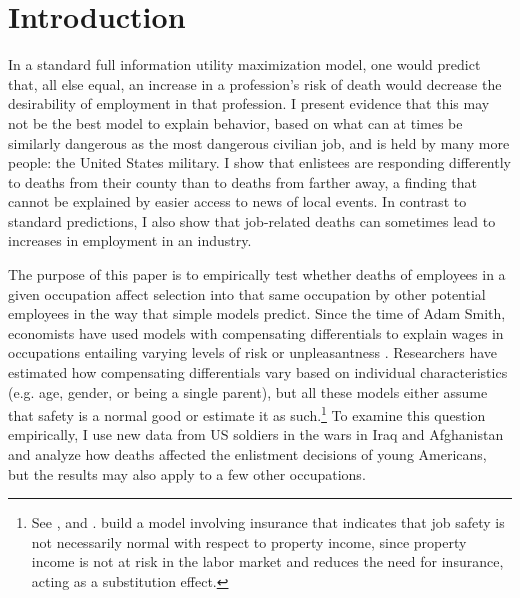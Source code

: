 \documentclass[12pt] {article}
\begin{document}
\section{Introduction\label{sec:Introduction}}
In a standard full information utility maximization model, one would predict that, all else equal, an increase in a profession's risk of death would decrease the desirability of employment in that profession. I present evidence that this may not be the best model to explain behavior, based on what can at times be similarly dangerous as the most dangerous civilian job, and is held by many more people: the United States military. I show that enlistees are responding differently to deaths from their county than to deaths from farther away, a finding that cannot be explained by easier access to news of local events. In contrast to standard predictions, I also show that job-related deaths can sometimes lead to increases in employment in an industry.

The purpose of this paper is to empirically test whether deaths of employees in a given occupation affect selection into that same occupation by other potential employees in the way that simple models predict. Since the time of Adam Smith, economists have used models with compensating differentials to explain wages in occupations entailing varying levels of risk or unpleasantness \citep{AdamSmith}. %
Researchers have estimated how compensating differentials vary based on individual characteristics (e.g. age, gender, or being a single parent), but all these models either assume that safety is a normal good or estimate it as such.\footnote{See \cite{DeLeireLevy2004}, \cite{BiddleZarkin} and \cite{garen1988compensating}. \cite{thaler1976value} build a model involving insurance that indicates that job safety is not necessarily normal with respect to property income, since property income is not at risk in the labor market and reduces the need for insurance, acting as a substitution effect.} To examine this question empirically, I use new data from US soldiers in the wars in Iraq and Afghanistan and analyze how deaths affected the enlistment decisions of young Americans, but the results may also apply to a few other occupations.
\end{document}
